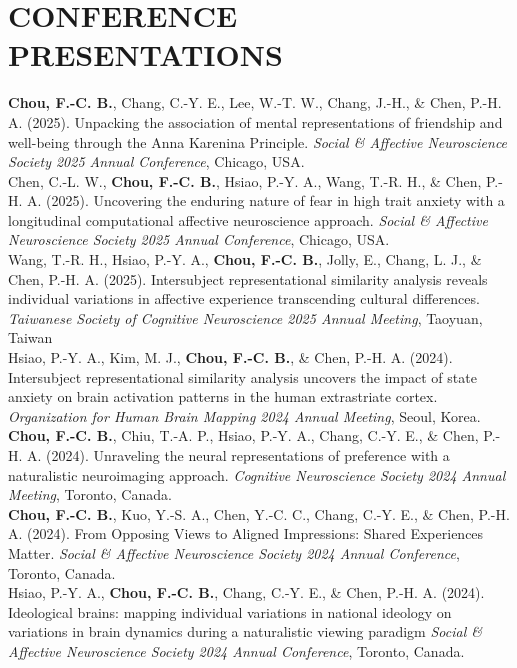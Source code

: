 \documentclass[a4paper,12pt]{article}
\newcommand{\itemspace}{7pt} %
\begin{document}
\section*{CONFERENCE PRESENTATIONS}
\noindent\textbf{Chou, F.-C. B.}, Chang, C.-Y. E., Lee, W.-T. W., Chang, J.-H., \& Chen, P.-H. A. (2025). Unpacking the association of mental representations of friendship and well-being through the Anna Karenina Principle. \textit{Social \& Affective Neuroscience Society 2025 Annual Conference}, Chicago, USA. \\[\itemspace]
\noindent Chen, C.-L. W., \textbf{Chou, F.-C. B.}, Hsiao, P.-Y. A., Wang, T.-R. H., \& Chen, P.-H. A. (2025). Uncovering the enduring nature of fear in high trait anxiety with a longitudinal computational affective neuroscience approach. \textit{Social \& Affective Neuroscience Society 2025 Annual Conference}, Chicago, USA. \\[\itemspace]
\noindent Wang, T.-R. H., Hsiao, P.-Y. A., \textbf{Chou, F.-C. B.}, Jolly, E., Chang, L. J., \& Chen, P.-H. A. (2025). Intersubject representational similarity analysis reveals individual variations in affective experience transcending cultural differences. \textit{Taiwanese Society of Cognitive Neuroscience 2025 Annual Meeting}, Taoyuan, Taiwan\\[\itemspace]
\noindent Hsiao, P.-Y. A., Kim, M. J., \textbf{Chou, F.-C. B.}, \& Chen, P.-H. A. (2024). Intersubject representational similarity analysis uncovers the impact of state anxiety on brain activation patterns in the human extrastriate cortex. \textit{Organization for Human Brain Mapping 2024 Annual Meeting}, Seoul, Korea.\\[\itemspace]
\noindent \textbf{Chou, F.-C. B.}, Chiu, T.-A. P., Hsiao, P.-Y. A., Chang, C.-Y. E., \& Chen, P.-H. A. (2024). Unraveling the neural representations of preference with a naturalistic neuroimaging approach. \textit{Cognitive Neuroscience Society 2024 Annual Meeting}, Toronto, Canada.\\[\itemspace]
\noindent\textbf{Chou, F.-C. B.}, Kuo, Y.-S. A., Chen, Y.-C. C., Chang, C.-Y. E., \& Chen, P.-H. A. (2024). From Opposing Views to Aligned Impressions: Shared Experiences Matter. \textit{Social \& Affective Neuroscience Society 2024 Annual Conference}, Toronto, Canada. \\[\itemspace]
\noindent Hsiao, P.-Y. A., \textbf{Chou, F.-C. B.}, Chang, C.-Y. E., \& Chen, P.-H. A. (2024). Ideological brains: mapping individual variations in national ideology on variations in brain dynamics during a naturalistic viewing paradigm \textit{Social \& Affective Neuroscience Society 2024 Annual Conference}, Toronto, Canada. \\[\itemspace]
\end{document}
